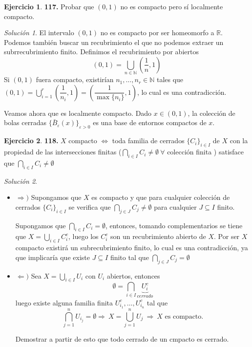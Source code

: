 \documentclass[12pt,twoside]{report}
\theoremstyle{azul}
\theoremstyle{azul2}
\theoremstyle{plain}
\theoremstyle{definition}
\newtheorem*{ejer}{Ejercicio}
\theoremstyle{remark}
\newtheorem*{sol}{Solución}
\begin{document}
\begin{ejer}
    \textbf{117.} Probar que $(0,1)$ no es compacto pero sí localmente compacto.
\end{ejer}
\begin{sol}
  El intervalo $(0,1)$ no es compacto por ser homeomorfo a $\mathbb{R}$. Podemos también buscar un recubrimiento el que no podemos extraer un subrrecubrimiento finito. Definimos el recubrimiento por abiertos
  $$(0,1)=\bigcup_{n \in \mathbb{N}} \left(\dfrac{1}{n},1\right)$$
  Si $(0,1)$ fuera compacto, existirían $n_1, \ldots, n_r \in \mathbb{N}$ tales que $\displaystyle (0,1)=\bigcup_{i=1}^r \left(\dfrac{1}{n_i},1\right)=\left(\dfrac{1}{\max{\{n_i}\}}, 1\right)$, lo cual es una contradicción.

Veamos ahora que es localmente compacto. Dado $x\in (0,1)$, la colección de bolas cerradas $\{\bar{B}_{\varepsilon}(x)\}_{\varepsilon>0}$ es una base de entornos compactos de $x$.


\end{sol}
\begin{ejer}
    \textbf{118.} $X$ compacto $\iff$ toda familia de cerrados $\{C_i\}_{i \in I}$ de $X$ con la propiedad de las intersecciones finitas ($\underset{i\in I}{\bigcap} C_i \neq \emptyset \: \forall$ colección finita ) satisface que $\displaystyle \bigcap_{i \in I} C_i \neq \emptyset$
\end{ejer}
\begin{sol}\:\vspace{-5mm}
\begin{itemize}
    \item $\Rightarrow)$ Supongamos que $X$ es compacto y que para cualquier colección de cerrados $\{C_i\}_{i\in I}$ se verifica que $\underset{j\in J}{\bigcap}C_j\neq \emptyset$ para cualquier $J\subseteq I$ finito.
    
    Supongamos que $\underset{i\in I}{\bigcap}C_i=\emptyset$, entonces, tomando complementarios se tiene que $X=\underset{i\in I}{\bigcup}C_i^c$, luego los $C_i^c$ son un recubrimiento abierto de $X$. Por ser $X$ compacto existirá un subrecubrimiento finito, lo cual es una contradicción, ya que implicaría que existe $J\subseteq I$ finito tal que $\underset{j\in J}{\bigcap}C_j = \emptyset$
\item $\Leftarrow)$ Sea $X=\bigcup_{i \in I} \displaystyle U_i$ con $U_i$ abiertos, entonces
$$\emptyset=\bigcap_{i \in I} \underbrace{U_i^c}_{cerrado}$$
luego existe alguna familia finita $U_{i_1}^c, \ldots, U_{i_n}^c$ tal que 
$$\bigcap_{j=1}^n U_{i_j}=\emptyset \Rightarrow \: X=\bigcup_{j=1}^n U_j \: \Rightarrow \: X \text{ es compacto.}$$

Demostrar a partir de esto que todo cerrado de un cmpacto es cerrado.
\end{itemize}
\end{sol}
\end{document}
